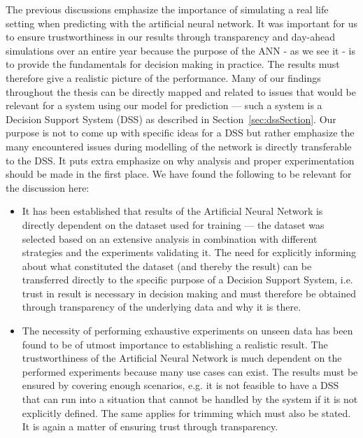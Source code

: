 The previous discussions emphasize the importance of simulating a real life setting when predicting with the artificial neural network. It was important for us to ensure trustworthiness in our results through transparency and day-ahead simulations over an entire year because the purpose of the ANN - as we see it - is to provide the fundamentals for decision making in practice. The results must therefore give a realistic picture of the performance. Many of our findings throughout the thesis can be directly mapped and related to issues that would be relevant for a system using our model for prediction --- such a system is a Decision Support System (DSS) as described in Section~\ref{sec:dssSection}. Our purpose is not to come up with specific ideas for a DSS but rather emphasize the many encountered issues during modelling of the network is directly transferable to the DSS. It puts extra emphasize on why analysis and proper experimentation should be made in the first place. We have found the following to be relevant for the discussion here:

\begin{itemize}
\item It has been established that results of the Artificial Neural Network is directly dependent on the dataset used for training --- the dataset was selected based on an extensive analysis in combination with different strategies and the experiments validating it. The need for explicitly informing about what constituted the dataset (and thereby the result) can be transferred directly to the specific purpose of a Decision Support System, i.e. trust in result is necessary in decision making and must therefore be obtained through transparency of the underlying data and why it is there. 
\item The necessity of performing exhaustive experiments on unseen data has been found to be of utmost importance to establishing a realistic result. The trustworthiness of the Artificial Neural Network is much dependent on the performed experiments because many use cases can exist. The results must be ensured by covering enough scenarios, e.g. it is not feasible to have a DSS that can run into a situation that cannot be handled by the system if it is not explicitly defined. The same applies for trimming which must also be stated. It is again a matter of ensuring trust through transparency.
\end{itemize}

